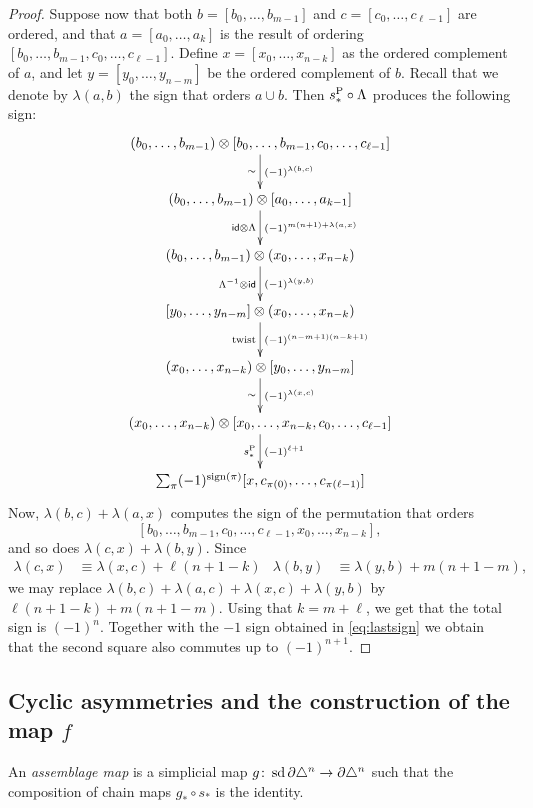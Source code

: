 \begin{proof}
	Suppose now that both $b=[b_0,\ldots,b_{m-1}]$ and $c=[c_0,\ldots,c_{\ell-1}]$ are ordered, and that $a = [a_0,\ldots,a_k]$ is the result of ordering $[b_0,\ldots,b_{m-1},c_0,\ldots,c_{\ell-1}]$. Define $x=[x_0,\ldots,x_{n-k}]$ as the ordered complement of $a$, and let $y=[y_0,\ldots,y_{n-m}]$ be the ordered complement of $b$. Recall that we denote by $\lambda(a,b)$ the sign that orders $a\cup b$. Then $s_*^{\operatorname{P}}\circ \Lambda$ produces the following sign:
	\[
	\xymatrix{
		(b_0,\ldots,b_{m-1}) \ot  [b_0,\ldots,b_{m-1},c_0,\ldots,c_{\ell-1}]
		\ar[d]^-{(-1)^{\lambda(b,c)}}_-{\sim}
		\\
		(b_0,\ldots,b_{m-1}) \ot  [a_0,\ldots,a_{k-1}]
		\ar[d]^{(-1)^{m(n+1)+\lambda(a,x)}}_{\id \ot  \Lambda}
		\\
		(b_0,\ldots,b_{m-1}) \ot  (x_0,\ldots,x_{n-k})
		\ar[d]^-{(-1)^{\lambda(y,b)}}_-{\Lambda^{-1} \ot  \id}
		\\
		[y_0,\ldots,y_{n-m}] \ot  (x_0,\ldots,x_{n-k})
		\ar[d]^-{(-1)^{(n-m+1)(n-k+1)}}_-{\twist}
		\\
		(x_0,\ldots,x_{n-k}) \ot  [y_0,\ldots,y_{n-m}]
		\ar[d]^-{(-1)^{\lambda(x,c)}}_-{\sim}
		\\
		(x_0,\ldots,x_{n-k}) \ot  [x_0,\ldots,x_{n-k},c_0,\ldots,c_{\ell-1}]
		\ar[d]^-{(-1)^{\ell+1}}_-{s_*^{\Psd}}
		\\
		\sum_{\perm} (-1)^{\sign{\perm}}[x,c_{\perm(0)},\ldots,c_{\perm(\ell-1)}]
	}
	\]
	Now, $\lambda(b,c) + \lambda(a,x)$ computes the sign of the permutation that orders
	\[
	[b_0,\ldots,b_{m-1},c_0,\ldots,c_{\ell-1},x_{0},\ldots,x_{n-k}],
	\]
	and so does $\lambda(c,x)+\lambda(b,y)$. Since
	\begin{align*}
		\lambda(c,x) &\equiv \lambda(x,c) + \ell(n+1-k)
		&
		\lambda(b,y) &\equiv \lambda(y,b) + m(n+1-m),
	\end{align*}
	we may replace $\lambda(b,c)+\lambda(a,c) + \lambda(x,c) + \lambda(y,b)$ by $\ell(n+1-k)+m(n+1-m)$. Using that $k=m+\ell$, we get that the total sign is $(-1)^{n}$. Together with the $-1$ sign obtained in \eqref{eq:lastsign} we obtain that the second square also commutes up to $(-1)^{n+1}$.
\end{proof}

\subsection{Cyclic asymmetries and the construction of the map \texorpdfstring{$f$}{f}}

\begin{definition}
	An \emph{assemblage map} is a simplicial map $g \colon  \operatorname{sd} \partial \triangle^n\to \partial \triangle^n$ such that the composition of chain maps $g_*\circ s_*$ is the identity.
\end{definition}

